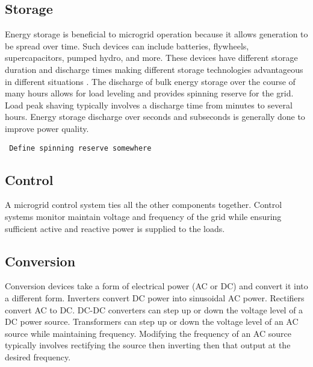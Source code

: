 \subsection{Storage}
Energy storage is beneficial to microgrid operation because it allows generation to be spread over time. Such devices can include batteries, flywheels, supercapacitors, pumped hydro, and more. These devices have different storage duration and discharge times making different storage technologies advantageous in different situations \cite{Schoenung2003}. The discharge of bulk energy storage over the course of many hours allows for load leveling and provides spinning reserve for the grid. Load peak shaving typically involves a discharge time from minutes to several hours. Energy storage discharge over seconds and subseconds is generally done to improve power quality.
\begin{verbatim}
 Define spinning reserve somewhere
\end{verbatim}

\subsection{Control}
A microgrid control system ties all the other components together. Control systems monitor maintain voltage and frequency of the grid while ensuring sufficient active and reactive power is supplied to the loads.

\subsection{Conversion}
Conversion devices take a form of electrical power (AC or DC) and convert it into a different form. Inverters convert DC power into sinusoidal AC power. Rectifiers convert AC to DC. DC-DC converters can step up or down the voltage level of a DC power source. Transformers can step up or down the voltage level of an AC source while maintaining frequency. Modifying the frequency of an AC source typically involves rectifying the source then inverting then that output at the desired frequency.

